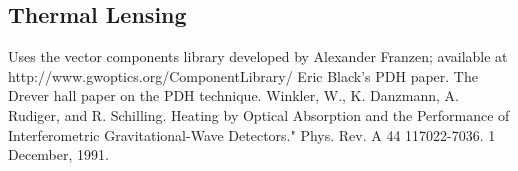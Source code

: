 \documentclass[10pt,a4paper]{article}
\begin{document}
\subsection{Thermal Lensing}


\begin{thebibliography}{9}
		Uses the vector components library developed by Alexander Franzen; available at http://www.gwoptics.org/ComponentLibrary/
		Eric Black's PDH paper.
		The Drever hall paper on the PDH technique.		
		Winkler, W., K. Danzmann, A. Rudiger, and R. Schilling. Heating by Optical Absorption and 
		the Performance of Interferometric Gravitational-Wave Detectors." Phys. Rev. A 44 117022-7036. 1 December, 1991.
\end{thebibliography}		
\end{document}
